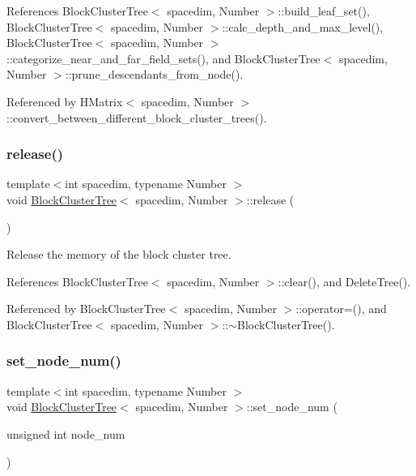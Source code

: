 References Block\+Cluster\+Tree$<$ spacedim, Number $>$\+::build\+\_\+leaf\+\_\+set(), Block\+Cluster\+Tree$<$ spacedim, Number $>$\+::calc\+\_\+depth\+\_\+and\+\_\+max\+\_\+level(), Block\+Cluster\+Tree$<$ spacedim, Number $>$\+::categorize\+\_\+near\+\_\+and\+\_\+far\+\_\+field\+\_\+sets(), and Block\+Cluster\+Tree$<$ spacedim, Number $>$\+::prune\+\_\+descendants\+\_\+from\+\_\+node().



Referenced by H\+Matrix$<$ spacedim, Number $>$\+::convert\+\_\+between\+\_\+different\+\_\+block\+\_\+cluster\+\_\+trees().

\mbox{\label{classBlockClusterTree_a0415fe94fd480bbb985a45dc691e2bed}} 
\subsubsection{\texorpdfstring{release()}{release()}}
{\footnotesize\ttfamily template$<$int spacedim, typename Number $>$ \\
void \hyperlink{classBlockClusterTree}{Block\+Cluster\+Tree}$<$ spacedim, Number $>$\+::release (\begin{DoxyParamCaption}{ }\end{DoxyParamCaption})}

Release the memory of the block cluster tree. 

References Block\+Cluster\+Tree$<$ spacedim, Number $>$\+::clear(), and Delete\+Tree().



Referenced by Block\+Cluster\+Tree$<$ spacedim, Number $>$\+::operator=(), and Block\+Cluster\+Tree$<$ spacedim, Number $>$\+::$\sim$\+Block\+Cluster\+Tree().

\mbox{\label{classBlockClusterTree_a02be4a882acca918386ad024769925bc}} 
\subsubsection{\texorpdfstring{set\+\_\+node\+\_\+num()}{set\_node\_num()}}
{\footnotesize\ttfamily template$<$int spacedim, typename Number $>$ \\
void \hyperlink{classBlockClusterTree}{Block\+Cluster\+Tree}$<$ spacedim, Number $>$\+::set\+\_\+node\+\_\+num (\begin{DoxyParamCaption}\item[{unsigned int}]{node\+\_\+num }\end{DoxyParamCaption})}

